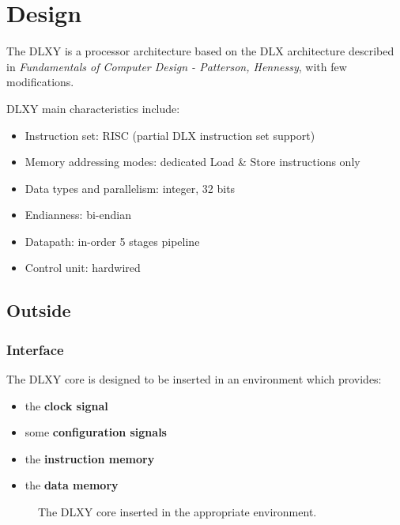 \graphicspath{{./chapters/01-design/figures/}}

\chapter{Design}
\label{chap:design}

The DLXY is a processor architecture based on the DLX architecture described
in \textit{Fundamentals of Computer Design - Patterson, Hennessy}, with few
modifications.

\bigskip
DLXY main characteristics include:
\begin{itemize}
	\item Instruction set: RISC (partial DLX instruction set support)
	\item Memory addressing modes: dedicated Load \& Store instructions only
	\item Data types and parallelism: integer, 32 bits
	\item Endianness: bi-endian
	\item Datapath: in-order 5 stages pipeline
	\item Control unit: hardwired
\end{itemize}

\section{Outside}

\subsection{Interface}
The DLXY core is designed to be inserted in an environment which provides:
\begin{itemize}
	\item the \textbf{clock signal}
	\item some \textbf{configuration signals}
	\item the \textbf{instruction memory}
	\item the \textbf{data memory}
\end{itemize}

\begin{figure}[H]
	\centering
	\caption{The DLXY core inserted in the appropriate environment.}
	\label{fig:env_top}
\end{figure}

